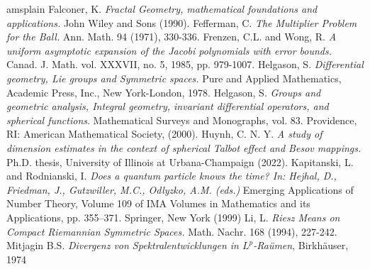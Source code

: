 \documentclass[12pt]{amsart}
\theoremstyle{definition}
\numberwithin{equation}{section}
\begin{document}
\begin{thebibliography}{amsplain}
 Falconer, K. {\em Fractal Geometry, mathematical foundations and applications.} John Wiley and Sons (1990).
 Fefferman, C. {\em The Multiplier Problem for the Ball.} Ann. Math. 94 (1971), 330-336. 
 Frenzen, C.L. and Wong, R. {\em A uniform asymptotic expansion of the Jacobi polynomials with error bounds.} Canad. J. Math. vol. XXXVII, no. 5, 1985, pp. 979-1007.
 Helgason, S. {\em Differential geometry, Lie groups and Symmetric spaces.} Pure and Applied Mathematics, Academic Press, Inc., New York-London, 1978.
 Helgason, S. {\em Groups and geometric analysis, Integral geometry, invariant differential operators, and spherical functions}. Mathematical Surveys and Monographs, vol. 83. Providence, RI: American Mathematical Society, (2000).
 Huynh, C. N. Y. {\em A study of dimension estimates in the context of spherical Talbot effect and Besov mappings.} Ph.D. thesis, University of Illinois at Urbana-Champaign (2022).
 Kapitanski, L. and Rodnianski, I. {\em Does a quantum particle knows the time? In: Hejhal, D., Friedman, J., Gutzwiller, M.C., Odlyzko, A.M. (eds.)} Emerging Applications of Number Theory, Volume 109 of IMA Volumes in Mathematics and its Applications, pp. 355–371. Springer, New York (1999)
 Li, L. {\em Riesz Means on Compact Riemannian Symmetric Spaces.} Math. Nachr. 168 (1994), 227-242. 
 Mitjagin B.S. {\em Divergenz von Spektralentwicklungen in $L^p$-Ra\"umen}, Birkh\"auser, 1974



\end{thebibliography}
\end{document}
